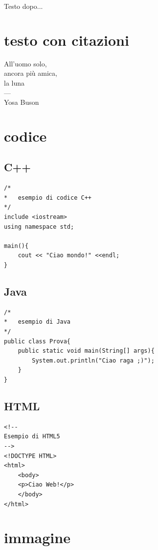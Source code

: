 \documentclass[12pt,a4paper]{article}
\begin{document}
Testo dopo...
\newpage

\section{testo con citazioni}
All'uomo solo,\\
ancora pi\`{u} amica,\\
la luna\\
---\\
Yosa Buson
\newpage

\section{codice}
\subsection{C++}
\begin{lstlisting}[basicstyle=\ttfamily]
/*
*	esempio di codice C++
*/
include <iostream>
using namespace std;

main(){
	cout << "Ciao mondo!" <<endl;
}
\end{lstlisting}

\subsection{Java}
\begin{lstlisting}[basicstyle=\ttfamily]
/*
*	esempio di Java
*/
public class Prova{
	public static void main(String[] args){
		System.out.println("Ciao raga ;)");	
	}
}
\end{lstlisting}

\subsection{HTML}
\begin{lstlisting}[basicstyle=\ttfamily]
<!--
Esempio di HTML5
-->
<!DOCTYPE HTML>
<html>
	<body>
	<p>Ciao Web!</p>
	</body>
</html>
\end{lstlisting}
\newpage

%

\section{immagine}
\end{document}
